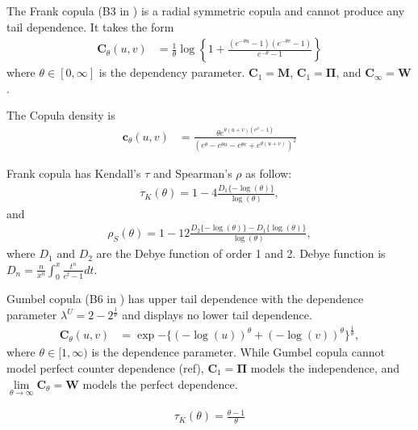 The Frank copula (B3 in \citet{joe1997multivariate}) is a radial symmetric copula and cannot produce any tail dependence.
It takes the form
\begin{align}
    \bm{C}_{\theta}(u,v) &= \frac{1}{\theta}
    \log \left\{
    1 + \frac{(e^{-\theta u}-1)(e^{-\theta v}-1)}{e^{-\theta}-1}
    \right\}
    \end{align}
where $\theta \in [0, \infty]$ is the dependency parameter.
$\bm{C}_1 = \bm{M}$, $\bm{C}_1 = \bm{\Pi}$, and $\bm{C}_\infty = \bm{W}$.

The Copula density is
\begin{align}
    \bm{c}_{\theta}(u,v) &= \frac{\theta e^{\theta(u+v)(e^\theta-1)}}
    {\left(e^\theta-e^{\theta u}-e^{\theta v}+e^{\theta (u+v)}\right)^2}
    \end{align}\medskip

Frank copula has Kendall's $\tau$ and Spearman's $\rho$ as follow:
\begin{align}
    \tau_K(\theta) = 1-4\frac{D_1\{-\log(\theta)\}}{\log(\theta)},
    \end{align}
and
\begin{align}
    \rho_S(\theta) = 1-12\frac{D_2\{-\log(\theta)\} - D_1\{\log(\theta)\}}{\log(\theta)},
    \end{align}
where $D_1$ and $D_2$ are the Debye function of order 1 and 2.
Debye function is $D_n = \frac{n}{x^n}\int_0^x\frac{t^n}{e^t-1}dt$.\medskip

Gumbel copula (B6 in \citet{joe1997multivariate}) has upper tail dependence with the dependence parameter
$\lambda^U = 2-2^{\frac{1}{\theta}}$ and displays no lower tail dependence.
\begin{align}
    \bm{C}_{\theta}(u,v) &= \exp{-\{
    (-\log(u))^\theta +(-\log(v))^\theta
    \}^{\frac{1}{\theta}}},
    \end{align}
where $\theta \in [1,\infty)$ is the dependence parameter.\medskip
While Gumbel copula cannot model perfect counter dependence (ref), $\bm{C}_{1} = \bm{\Pi}$ models the independence,
and $\lim\limits_{\theta \to \infty} \bm{C}_\theta = \bm{W}$ models the perfect dependence.


  \begin{align}
    \tau_K(\theta) =\frac{\theta-1}{\theta}
    \end{align}

